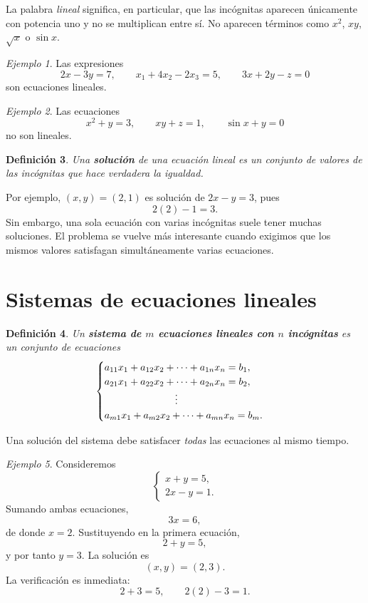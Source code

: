 \documentclass[12pt]{article}
\newtheorem{definicion}{Definición}[section]
\theoremstyle{remark}
\newtheorem{ejemplo}[definicion]{Ejemplo}
\begin{document}
La palabra \emph{lineal} significa, en particular, que las incógnitas aparecen únicamente con potencia
uno y no se multiplican entre sí. No aparecen términos como $x^2$, $xy$, $\sqrt{x}$ o $\sin x$.

\begin{ejemplo}
Las expresiones
\[
2x-3y=7,\qquad x_1+4x_2-2x_3=5,\qquad 3x+2y-z=0
\]
son ecuaciones lineales.
\end{ejemplo}

\begin{ejemplo}
Las ecuaciones
\[
x^2+y=3,\qquad xy+z=1,\qquad \sin x+y=0
\]
no son lineales.
\end{ejemplo}

\begin{definicion}
Una \textbf{solución} de una ecuación lineal es un conjunto de valores de las incógnitas que hace verdadera
la igualdad.
\end{definicion}

Por ejemplo, $(x,y)=(2,1)$ es solución de $2x-y=3$, pues
\[
2(2)-1=3.
\]
Sin embargo, una sola ecuación con varias incógnitas suele tener muchas soluciones. El problema se vuelve
más interesante cuando exigimos que los mismos valores satisfagan simultáneamente varias ecuaciones.

\section{Sistemas de ecuaciones lineales}

\begin{definicion}
Un \textbf{sistema de $m$ ecuaciones lineales con $n$ incógnitas} es un conjunto de ecuaciones
\[
\begin{cases}
a_{11}x_1+a_{12}x_2+\cdots+a_{1n}x_n=b_1,\\
a_{21}x_1+a_{22}x_2+\cdots+a_{2n}x_n=b_2,\\
\hspace{2.5cm}\vdots\\
a_{m1}x_1+a_{m2}x_2+\cdots+a_{mn}x_n=b_m.
\end{cases}
\]
\end{definicion}

Una solución del sistema debe satisfacer \emph{todas} las ecuaciones al mismo tiempo.

\begin{ejemplo}
Consideremos
\[
\begin{cases}
x+y=5,\\
2x-y=1.
\end{cases}
\]
Sumando ambas ecuaciones,
\[
3x=6,
\]
de donde $x=2$. Sustituyendo en la primera ecuación,
\[
2+y=5,
\]
y por tanto $y=3$. La solución es
\[
(x,y)=(2,3).
\]
La verificación es inmediata:
\[
2+3=5,\qquad 2(2)-3=1.
\]
\end{ejemplo}
\end{document}
